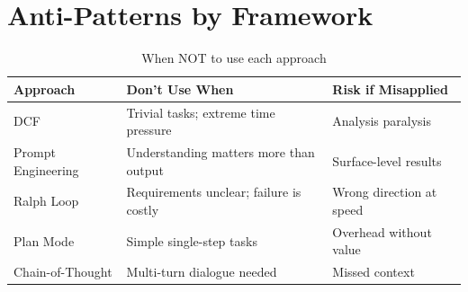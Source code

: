 \section{Anti-Patterns by Framework}

\begin{table}[H]
\centering
\begin{tabular}{p{3cm}p{5cm}p{5cm}}
\toprule
\textbf{Approach} & \textbf{Don't Use When} & \textbf{Risk if Misapplied} \\
\midrule
DCF & Trivial tasks; extreme time pressure & Analysis paralysis \\
Prompt Engineering & Understanding matters more than output & Surface-level results \\
Ralph Loop & Requirements unclear; failure is costly & Wrong direction at speed \\
Plan Mode & Simple single-step tasks & Overhead without value \\
Chain-of-Thought & Multi-turn dialogue needed & Missed context \\
\bottomrule
\end{tabular}
\caption{When NOT to use each approach}
\end{table}

